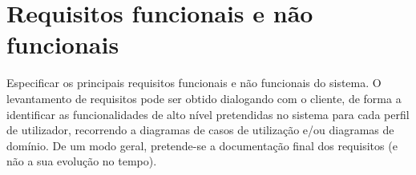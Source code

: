 \section{Requisitos funcionais e n\~ao funcionais} %
\label{sec:requisitos}

Especificar os principais requisitos funcionais e não funcionais do sistema. O levantamento de requisitos pode ser obtido dialogando com o cliente, de forma a identificar as funcionalidades de alto nível pretendidas no sistema para cada perfil de utilizador, recorrendo a diagramas de casos de utilização e/ou diagramas de domínio. De um modo geral, pretende-se a documentação final dos requisitos (e não a sua evolução no tempo).

